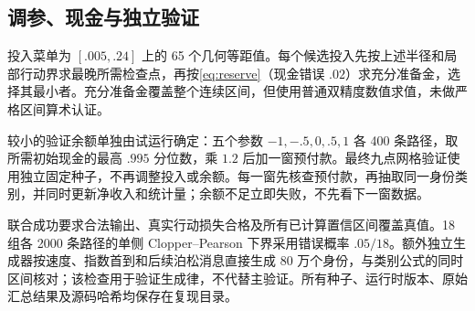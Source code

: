 \subsection{调参、现金与独立验证}
投入菜单为 $[.005,.24]$ 上的 65 个几何等距值。每个候选投入先按上述半径和局部行动界求最晚所需检查点，再按\eqref{eq:reserve}（现金错误 $.02$）求充分准备金，选择其最小者。充分准备金覆盖整个连续区间，但使用普通双精度数值求值，未做严格区间算术认证。

较小的验证余额单独由试运行确定：五个参数 $-1,-.5,0,.5,1$ 各 400 条路径，取所需初始现金的最高 $.995$ 分位数，乘 $1.2$ 后加一窗预付款。最终九点网格验证使用独立固定种子，不再调整投入或余额。每一窗先核查预付款，再抽取同一身份类别，并同时更新净收入和统计量；余额不足立即失败，不先看下一窗数据。

联合成功要求合法输出、真实行动损失合格及所有已计算置信区间覆盖真值。18 组各 2000 条路径的单侧 Clopper--Pearson 下界采用错误概率 $.05/18$。额外独立生成器按速度、指数首到和后续泊松消息直接生成 80 万个身份，与类别公式的同时区间核对；该检查用于验证生成律，不代替主验证。所有种子、运行时版本、原始汇总结果及源码哈希均保存在复现目录。
